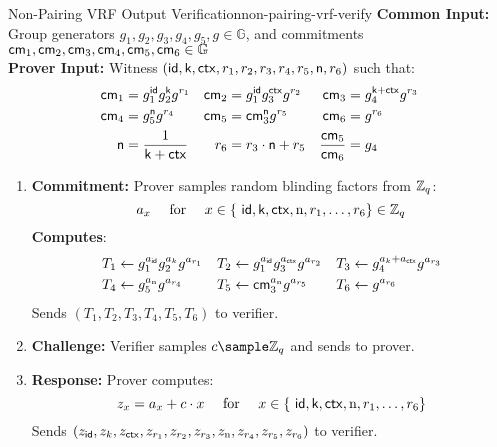 \newpage
\begin{protocol}{Non-Pairing VRF Output Verification}{non-pairing-vrf-verify}\label{pok-non-pairing-vrf}
\textbf{Common Input:} Group generators $g_1, g_2, g_3, g_4, g_5, g \in \mathbb{G}$, and commitments $\mathsf{cm}_1, \mathsf{cm}_2, \mathsf{cm}_3, \mathsf{cm}_4, \mathsf{cm}_5, \mathsf{cm}_6 \in \mathbb{G}$\\
\textbf{Prover Input:} Witness $(\mathsf{id}, \mathsf{k}, \mathsf{ctx}, r_1, r_2, r_3, r_4, r_5, \textsf{n}, r_6)$ such that:
    \begin{align*}
        \mathsf{cm}_1 &= g_1^{\mathsf{id}} g_2^{\mathsf{k}} g^{r_1}     &    \mathsf{cm}_2 &= g_1^{\mathsf{id}} g_3^{\mathsf{ctx}} g^{r_2}  &   \mathsf{cm}_3 &= g_4^{\mathsf{k} + \mathsf{ctx}} g^{r_3}\\
        \mathsf{cm}_4 &= g_5^{\textsf{n}} g^{r_4}   &   \mathsf{cm}_5 &= \mathsf{cm}_3^{\textsf{n}} g^{r_5}     &   \mathsf{cm}_6 &= g^{r_6} \\
        \textsf{n} &= \frac{1}{\mathsf{k} + \mathsf{ctx}}   &   r_6 &= r_3 \cdot \textsf{n} + r_5    &   \frac{\mathsf{cm}_5}{\mathsf{cm}_6} &= g_4 \\
    \end{align*}

\begin{enumerate}
    \item \textbf{Commitment:} Prover samples random blinding factors from $\mathbb{Z}_q$:
    \[
        a_x \quad \text{ for } \quad x \in \{\ \mathsf{id}, \mathsf{k}, \mathsf{ctx}, \text{n}, r_1, \ldots,r_6\} \in \mathbb{Z}_q
    \]
    \textbf{Computes}:
    \begin{align*}
        T_1 &\gets g_1^{a_{\mathsf{id}}} g_2^{a_k} g^{a_{r_1}}  &   T_2 &\gets g_1^{a_{\mathsf{id}}} g_3^{a_{\mathsf{ctx}}} g^{a_{r_2}}     &   T_3 &\gets g_4^{a_k + a_{\mathsf{ctx}}} g^{a_{r_3}} \\
        T_4 &\gets g_5^{a_{\text{n}}} g^{a_{r_4}}   &   T_5 &\gets \mathsf{cm}_3^{a_{\text{n}}} g^{a_{r_5}}     &   T_6 &\gets g^{a_{r_6}}
    \end{align*}
    Sends $(T_1, T_2, T_3, T_4, T_5, T_6)$ to verifier.
    
    \item \textbf{Challenge:} Verifier samples $c \sample \mathbb{Z}_q$ and sends to prover.
    
    \item \textbf{Response:} Prover computes:
    \[
    z_x = a_x + c \cdot x \quad \text{ for } \quad x \in \{\ \mathsf{id}, \mathsf{k}, \mathsf{ctx}, \text{n}, r_1, \ldots,r_6\} 
    \]
    Sends $(z_{\mathsf{id}}, z_k, z_{\mathsf{ctx}}, z_{r_1}, z_{r_2}, z_{r_3}, z_{\text{n}}, z_{r_4}, z_{r_5}, z_{r_6})$ to verifier.
    

\end{enumerate}
\end{protocol}
